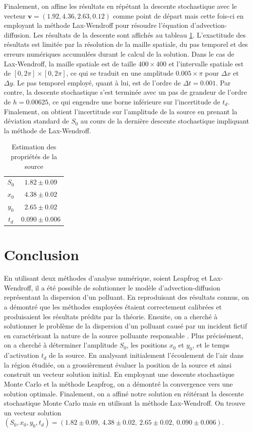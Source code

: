 \documentclass{article}
\begin{document}
Finalement, on affine les résultats en répétant la descente stochastique avec le vecteur  $\textbf{v} = (1.92, 4.36, 2.63, 0.12)$ comme point de départ mais cette fois-ci en employant la méthode Lax-Wendroff pour résoudre l'équation d'advection-diffusion. Les résultats de la descente sont affichés au tableau \ref{tab:resultats}. L'exactitude des résultats est limitée par la résolution de la maille spatiale, du pas temporel et des erreurs numériques accumulées durant le calcul de la solution. Dans le cas de Lax-Wendroff, la maille spatiale est de taille $400\times400$ et l'intervalle spatiale est de $[0, 2\pi]\times[0, 2\pi]$, ce qui se traduit en une amplitude $0.005\times\pi$ pour $\Delta x$ et $\Delta y$. Le pas temporel employé, quant à lui, est de l'ordre de $\Delta t=0.001$. Par contre, la descente stochastique s'est terminée avec un pas de grandeur de l'ordre de $h=0.00625$, ce qui engendre une borne inférieure sur l'incertitude de $t_d$. Finalement, on obtient l'incertitude sur l'amplitude de la source en prenant la déviation standard de $S_0$ au cours de la dernière descente stochastique impliquant la méthode de Lax-Wendroff.

\begin{table}[H]
	\centering
	\caption{Estimation des propriétés de la source}
	\label{tab:resultats}
	\begin{tabular}{|c|c|}
		\hline
		$S_0$ & $1.82 \pm 0.09$\\
		$x_0$ & $4.38 \pm 0.02$\\
		$y_0$ & $2.65 \pm 0.02$\\
		$t_d$ & $0.090 \pm 0.006$\\\hline
	\end{tabular}
\end{table}

\section*{Conclusion}

En utilisant deux méthodes d'analyse numérique, soient Leapfrog et Lax-Wendroff, il a été possible de solutionner le modèle d'advection-diffusion représentant la dispersion d'un polluant. En reproduisant des résultats connus, on a démontré que les méthodes employées étaient correctement calibrées et produisaient les résultats prédits par la théorie. Ensuite, on a cherché à solutionner le problème de la dispersion d'un polluant causé par un incident fictif en caractérisant la nature de la source polluante responsable . Plus précisément, on a cherché à déterminer l'amplitude $S_0$, les positions $x_0$ et $y_0$, et le temps d'activation $t_d$ de la source. En analysant initialement l'écoulement de l'air dans la région étudiée, on a grossièrement évaluer la position de la source et ainsi construit un vecteur solution initial. En employant une descente stochastique Monte Carlo et la méthode Leapfrog, on a démontré la convergence vers une solution optimale. Finalement, on a affiné notre solution en réitérant la descente stochastique Monte Carlo mais en utilisant la méthode Lax-Wendroff. On trouve un vecteur solution $(S_0, x_0, y_0, t_d) = (1.82 \pm 0.09,\ 4.38 \pm 0.02,\ 2.65 \pm 0.02,\ 0.090 \pm 0.006)$. 
\end{document}
